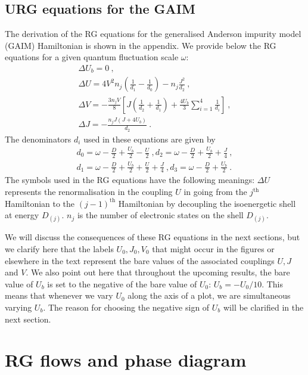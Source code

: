 \documentclass[reprint,superscriptaddress,floatfix]{revtex4-2}
\begin{document}
\subsection{URG equations for the GAIM}

The derivation of the RG equations for the generalised Anderson impurity model (GAIM) Hamiltonian is shown in the appendix. We provide below the RG equations for a given quantum fluctuation scale \(\omega\):
\begin{gather}
	\Delta U_b = 0~,\\
	\Delta U = 4V^2 n_j\left(\frac{1}{d_1} - \frac{1}{d_0}\right) - n_j\frac{J^2}{d_2}~,\\
	\Delta V = -\frac{3n_j V}{8}\left[J\left(\frac{1}{d_2} + \frac{1}{d_1}\right) +  \frac{4U_b}{3}\sum_{i=1}^4 \frac{1}{d_i}\right]~,\\
	\Delta J = -\frac{n_j J\left(J + 4U_b\right)}{d_2}~.
\end{gather}
The denominators \(d_i\) used in these equations are given by
\begin{gather}
	d_0 = \omega - \frac{D}{2} + \frac{U_b}{2} - \frac{U}{2}~,d_2 = \omega - \frac{D}{2} + \frac{U_b}{2} + \frac{J}{4}~,\\
	d_1 = \omega - \frac{D}{2} + \frac{U_b}{2} + \frac{U}{2} + \frac{J}{4}~,d_3 = \omega - \frac{D}{2} + \frac{U_b}{2}~.
\end{gather}
The symbols used in the RG equations have the following meanings: \(\Delta U\) represents the renormalisation in the coupling \(U\) in going from the \(j^\text{th}\) Hamiltonian to the \(\left( j-1 \right) ^\text{th}\) Hamiltonian by decoupling the isoenergetic shell at energy \(D_{(j)}\). \(n_j\) is the number of electronic states on the shell \(D_{(j)}\).

We will discuss the consequences of these RG equations in the next sections, but we clarify here that the labels \(U_0,J_0,V_0\) that might occur in the figures or elsewhere in the text represent the bare values of the associated couplings \(U,J\) and \(V\). We also point out here that throughout the upcoming results, the bare value of \(U_b\) is set to the negative of the bare value of \(U_0\): \(U_b = -U_0/10\). This means that whenever we vary \(U_0\) along the axis of a plot, we are simultaneous varying \(U_b\). The reason for choosing the negative sign of \(U_b\) will be clarified in the next section.

\section{RG flows and phase diagram}
\label{phase}
\end{document}
